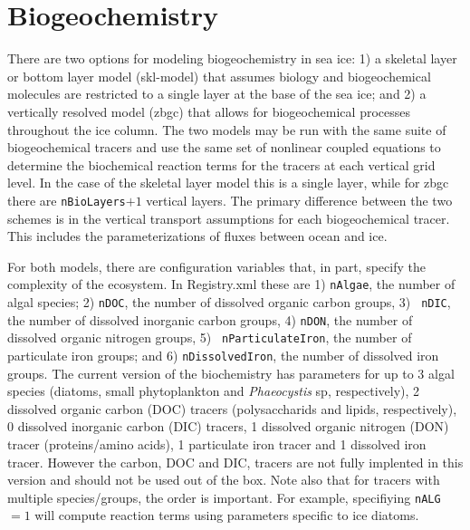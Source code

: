\section{Biogeochemistry}
\label{sec:biogeochemistry}

% 
\newcommand\bgcNO{\mbox{NO$_3$}}
\newcommand\bgcNH{\mbox{NH$_4$}}
\newcommand\bgcSi{\mbox{SiO$_3$}}
\newcommand\bgcN{\mbox{N}}
\newcommand\bgcDOC{\mbox{DOC}}
\newcommand\bgcDON{\mbox{DON}}
\newcommand\bgcfed{\mbox{fed}}
\newcommand\bgcfep{\mbox{fep}}
\newcommand\bgcchl{\ensuremath{\mbox{Chl}a}}
\newcommand\bgcDMS{\mbox{DMS}}
\newcommand\bgcDMSP{\mbox{DMSP}}
\newcommand\bgcDMSPp{\mbox{DMSPp}}
\newcommand\bgcDMSPd{\mbox{DMSPd}}
\newcommand\bgcPON{\mbox{PON}}
\newcommand\zaeroBC{\mbox{BC}}
\newcommand\zaerodust{\mbox{dust}}
\newcommand\bgcie{i.e.\ }


There are two options for modeling  biogeochemistry in  sea ice: 1) a
skeletal layer or bottom layer model (skl-model) that assumes
biology and biogeochemical molecules are restricted to a single layer at the base of the sea ice;
and 2) a vertically resolved model (zbgc) that allows for biogeochemical processes throughout the
ice column.  The two models may be run with the same suite of
biogeochemical tracers and use the same set of nonlinear coupled equations to determine the biochemical
reaction terms for the tracers at each vertical grid level.  In the
case of the skeletal layer model this is a single layer, while for
zbgc  there are {\tt nBioLayers}$+1$ vertical layers.  The primary difference between the
two schemes is in the vertical transport assumptions for each
biogeochemical tracer.  This includes the parameterizations
of fluxes between ocean and ice.  

For both models, there are configuration variables that, in part, specify the
complexity of the ecosystem.  In Registry.xml these are 1) {\tt nAlgae}, the number of algal species; 2)
{\tt nDOC}, the number of dissolved organic carbon groups, 3)  {\tt
  nDIC}, the number of dissolved inorganic carbon groups, 4)
{\tt nDON}, the number of dissolved organic nitrogen groups, 5)  {\tt
  nParticulateIron}, the number of particulate iron groups; and 6) {\tt nDissolvedIron},
the number of dissolved iron groups.  The current version of the
 biochemistry has parameters for up to 3 algal
species (diatoms, small phytoplankton and {\it Phaeocystis} sp,
respectively), 2 dissolved organic carbon (DOC) tracers (polysaccharids and lipids,
respectively), 0 dissolved inorganic carbon (DIC) tracers, 1 dissolved
organic nitrogen (DON) tracer (proteins/amino acids),
1 particulate iron tracer and 1 dissolved iron tracer.  However the
carbon, DOC and DIC, tracers are not fully implented in this version and
should not be used out of the box. Note also that for
tracers with multiple species/groups, the
order is important.  For example, specifiying {\tt nALG}$ = 1$ will
compute reaction terms using parameters specific to ice diatoms.  

